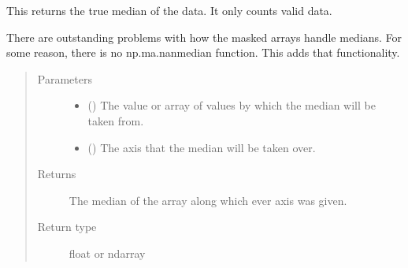 \documentclass[letterpaper,10pt,english]{sphinxmanual}
\begin{document}
\begin{fulllineitems}
\label{\detokenize{docstrings/ifa_smeargle.core.mathematics:ifa_smeargle.core.mathematics.ifas_masked_median}}
This returns the true median of the data. It only counts
valid data.

There are outstanding problems with how the masked arrays
handle medians. For some reason, there is no np.ma.nanmedian
function. This adds that functionality.
\begin{quote}\begin{description}
\item[{Parameters}] \leavevmode\begin{itemize}
\item {} 
 () \textendash{} The value or array of values by which the median will be
taken from.

\item {} 
 () \textendash{} The axis that the median will be taken over.

\end{itemize}

\item[{Returns}] \leavevmode
{} \textendash{} The median of the array along which ever axis was given.

\item[{Return type}] \leavevmode
float or ndarray

\end{description}\end{quote}

\end{fulllineitems}

\end{document}
